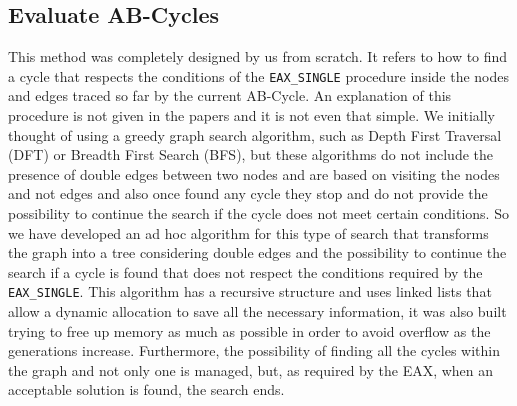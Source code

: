 \subsection{Evaluate AB-Cycles}
This method was completely designed by us from scratch. It refers to how to find a cycle that respects the conditions of the \texttt{EAX\_SINGLE} procedure inside the nodes and edges traced so far by the current AB-Cycle. An explanation of this procedure is not given in the papers \cite{Nagata2013, Honda2013} and it is not even that simple. We initially thought of using a greedy graph search algorithm, such as Depth First Traversal (DFT) or Breadth First Search (BFS), but these algorithms do not include the presence of double edges between two nodes and are based on visiting the nodes and not edges and also once found any cycle they stop and do not provide the possibility to continue the search if the cycle does not meet certain conditions. So we have developed an ad hoc algorithm for this type of search that transforms the graph into a tree considering double edges and the possibility to continue the search if a cycle is found that does not respect the conditions required by the \texttt{EAX\_SINGLE}. This algorithm has a recursive structure and uses linked lists that allow a dynamic allocation to save all the necessary information, it was also built trying to free up memory as much as possible in order to avoid overflow as the generations increase. Furthermore, the possibility of finding all the cycles within the graph and not only one is managed, but, as required by the EAX, when an acceptable solution is found, the search ends.

